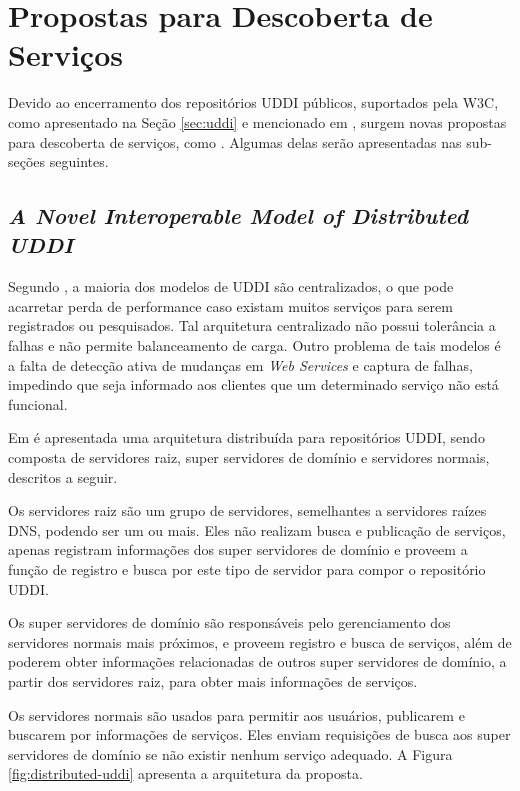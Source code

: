 \section{Propostas para Descoberta de Serviços} \label{sec:propostas-descoberta-ws}

Devido ao encerramento dos repositórios UDDI públicos, suportados pela W3C,  como apresentado na Seção \ref{sec:uddi} e mencionado em \cite{lausen2007finding} \cite{treiber2007active}, surgem novas propostas para descoberta de serviços, como \cite{lausen2007finding} \cite{wu2008novel} \cite{wu2009new} \cite{al2008toward} \cite{borges2007arquitetura}. Algumas delas serão apresentadas nas sub-seções seguintes.

\subsection{\textit{A Novel Interoperable Model of Distributed UDDI} \cite{wu2008novel}} \label{sec:novel-model-uddi}

Segundo \cite{wu2008novel}, a maioria dos modelos de UDDI são centralizados, o que pode acarretar perda de performance caso existam muitos serviços para serem registrados ou pesquisados. Tal arquitetura centralizado não possui tolerância a falhas e não permite balanceamento de carga. Outro problema de tais modelos é a falta de detecção ativa de mudanças em \textit{Web Services} e captura de falhas, impedindo que seja informado aos clientes que um determinado serviço não está funcional.

Em \cite{wu2008novel} é apresentada uma arquitetura distribuída para repositórios UDDI, sendo composta de servidores raiz, super servidores de domínio e servidores normais, descritos a seguir. 

Os servidores raiz são um grupo de servidores, semelhantes a servidores raízes DNS, podendo ser um ou mais. Eles não realizam busca e publicação de serviços, apenas registram informações dos super servidores de domínio e proveem a função de registro e busca por este tipo de servidor para compor o repositório UDDI.

Os super servidores de domínio são responsáveis pelo gerenciamento dos servidores normais mais próximos, e proveem registro e busca de serviços, além de poderem obter informações relacionadas de outros super servidores de domínio, a partir dos servidores raiz, para obter mais informações de serviços.

Os servidores normais são usados para permitir aos usuários, publicarem e buscarem por informações de serviços. Eles enviam requisições de busca aos super servidores de domínio se não existir nenhum serviço adequado. A Figura \ref{fig:distributed-uddi} apresenta a arquitetura da proposta.

